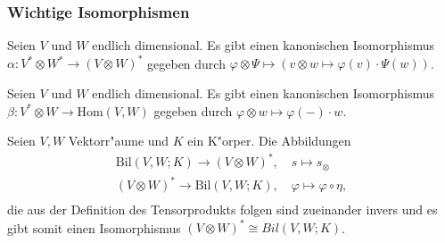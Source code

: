 \documentclass[8pt, a4paper, twocolumn, landscape]{article}
\begin{document}
\subsubsection{Wichtige Isomorphismen}

\begin{theorem}
Seien $V$ und $W$ endlich dimensional. Es gibt einen kanonischen Isomorphismus $\alpha : V^* \otimes W^* \rightarrow (V \otimes W)^*$ gegeben durch $\varphi \otimes \Psi \mapsto \left( v \otimes w \mapsto \varphi(v) \cdot \Psi(w)\right) $.
\end{theorem}

\begin{theorem}
Seien $V$ und $W$ endlich dimensional. Es gibt einen kanonischen Isomorphismus $\beta : V^* \otimes W \rightarrow \mathrm{Hom}(V, W)$ gegeben durch $\varphi \otimes w \mapsto \varphi (-) \cdot w$.
\end{theorem}

\begin{theorem}
Seien $V, W$ Vektorr"aume und $K$ ein K"orper. Die Abbildungen 
\begin{gather*}
\mathrm{Bil}(V, W; K) \rightarrow (V \otimes W)^*, \quad s \mapsto s_\otimes \\ 
(V \otimes W)^* \rightarrow \mathrm{Bil}(V, W; K) , \quad \varphi \mapsto \varphi \circ \eta,  \\  
\end{gather*}
die aus der Definition des Tensorprodukts folgen sind zueinander invers und es gibt somit einen Isomorphismus $(V \otimes W)^* \cong Bil(V, W; K)$.
\end{theorem}
\end{document}
